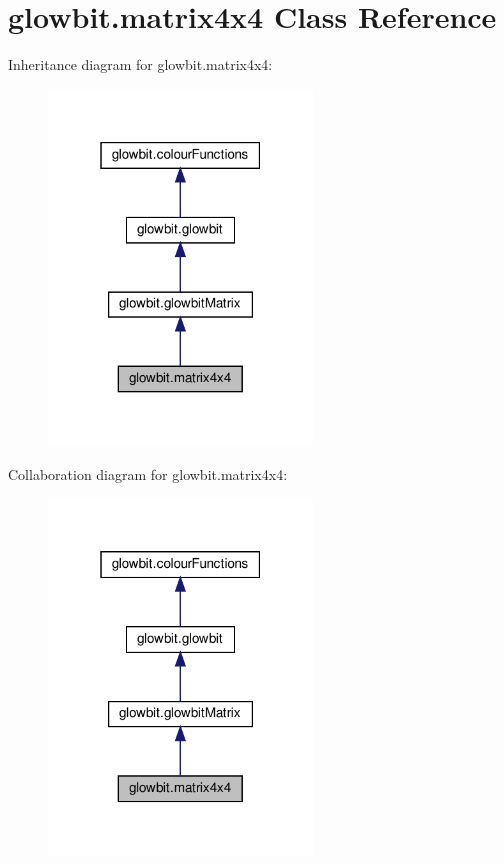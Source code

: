 \hypertarget{classglowbit_1_1matrix4x4}{}\section{glowbit.\+matrix4x4 Class Reference}
\label{classglowbit_1_1matrix4x4}


Inheritance diagram for glowbit.\+matrix4x4\+:\nopagebreak
\begin{figure}[H]
\begin{center}
\leavevmode
\includegraphics[width=199pt]{classglowbit_1_1matrix4x4__inherit__graph}
\end{center}
\end{figure}


Collaboration diagram for glowbit.\+matrix4x4\+:\nopagebreak
\begin{figure}[H]
\begin{center}
\leavevmode
\includegraphics[width=199pt]{classglowbit_1_1matrix4x4__coll__graph}
\end{center}
\end{figure}
